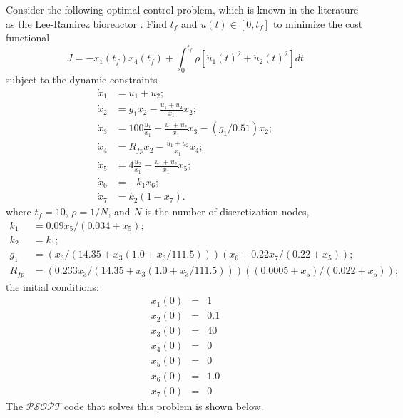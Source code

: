 \documentclass[a4paper,11pt]{report}    %
\newcommand{\psopt}{$\mathcal{PSOPT}$\,}  %
\begin{document}
Consider the following optimal control problem, which is known in the literature
as the Lee-Ramirez bioreactor \cite{Luus:02, Rutquist:09}.  Find $t_f$ and $u(t) \in [0, t_f]$ 
to minimize the cost functional
\begin{equation}
  J = -x_1(t_f) x_4(t_f) + \int_{0}^{t_f} \rho [ \dot{u}_1(t)^2 + \dot{u}_2(t)^2  ] dt
\end{equation}
subject to the dynamic constraints
\begin{equation}
  \begin{aligned}
    \dot x_1 &=   u_1 + u_2; \\
    \dot x_2 &=  g_1 x_2 - \frac{ u_1+u_2}{x_1} x_2; \\
    \dot x_3 &=  100 \frac{u_1}{x_1} - \frac{u_1+u_2}{x_1} x_3 - (g_1/0.51) x_2; \\
    \dot x_4 &=  R_{fp} x_2 - \frac{u_1+u_2}{x_1} x_4; \\
    \dot x_5 &=  4 \frac{u_2}{x_1} - \frac{u_1+u_2}{x_1} x_5; \\
    \dot x_6 &=  -k_1 x_6;  \\
    \dot x_7 &=  k_2 (1-x_7). 
  \end{aligned}
\end{equation}
where $t_f=10$, $\rho = 1/N$, and $N$ is the number of discretization nodes,
\begin{equation}
 \begin{aligned}
    k_1 & = 0.09 x_5/(0.034 + x_5);\\
    k_2 &= k_1; \\
    g_1 & = (x_3/(14.35 + x_3(1.0+x_3/111.5)))(x_6 + 0.22 x_7/(0.22+x_5)); \\
    R_{fp} &= (0.233 x_3/(14.35 + x_3 (1.0+x_3/111.5))) ((0.0005+x_5)/(0.022+x_5));
 \end{aligned}
\end{equation}
the initial conditions:
 \begin{equation}
  \begin{array}{lcl}
   x_1(0) &=& 1 \\
   x_2(0) &=& 0.1 \\
   x_3(0) &=& 40 \\
   x_4(0) &=& 0  \\
   x_5(0) &=& 0 \\
   x_6(0) &=& 1.0 \\
   x_7(0) &=& 0 
  \end{array}
\end{equation}
The \psopt code that solves this problem is shown below.  
\end{document}
